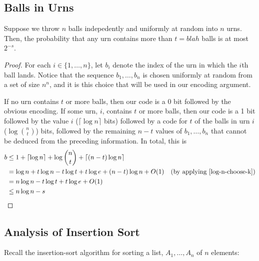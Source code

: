 \documentclass[lotsofwhite]{patmorin}
\begin{document}
\subsection{Balls in Urns}

\begin{thm}
  Suppose we throw $n$ balls indepedently and uniformly at random into $n$
  urns. Then, the probability that any urn contains more than $t=blah$
  balls is at most $2^{-s}$.
\end{thm}

\begin{proof}
  For each $i\in\{1,\ldots,n\}$, let $b_i$ denote the index of the urn in
  which the $i$th ball lands. Notice that the sequence $b_1,\ldots,b_n$
  is chosen uniformly at random from a set of size $n^n$, and it is this
  choice that will be used in our encoding argument.

  If no urn contains $t$ or more balls, then our code is a 0 bit followed
  by the obvious encoding. If some urn, $i$, contains $t$ or more balls,
  then our code is a 1 bit followed by the value $i$ ($\lceil \log
  n\rceil$ bits) followed by a code for $t$ of the balls in urn $i$
  ($\log\binom{n}{t}$) bits, followed by the remaining $n-t$ values of
  $b_1,\ldots,b_n$ that cannot be deduced from the preceding information.
  In total, this is
  \begin{align*}
    b &\le 1 + \lceil\log n\rceil + \log\binom{n}{t} 
           + \lceil(n-t)\log n\rceil \\
     & = \log n + t\log n - t\log t + t\log e  
           + (n-t)\log n + O(1)
             & \text{(by applying \eqref{log-n-choose-k})} \\
     & = n\log n - t\log t + t\log e + O(1) \\
     & \le  n\log n - s
  \end{align*}
\end{proof}

\subsection{Analysis of Insertion Sort}

Recall the insertion-sort algorithm for sorting a list, $A_1,\ldots,A_n$
of $n$ elements:

\begin{algorithmic}[1]
     \ENDWHILE
  \ENDFOR
\end{algorithmic}
\end{document}
